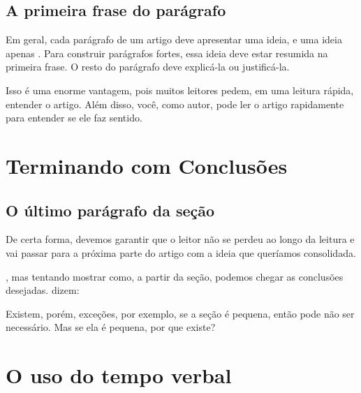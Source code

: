 \documentclass[openany]{book}
\begin{document}
\section{A primeira frase do parágrafo}

 Em geral, cada parágrafo de um artigo deve apresentar uma ideia, e uma ideia apenas . Para construir parágrafos fortes, essa ideia deve estar resumida na primeira frase. O resto do parágrafo deve explicá-la ou justificá-la.

 Isso é uma enorme vantagem, pois muitos leitores pedem, em uma leitura rápida, entender o artigo. Além disso, você, como autor, pode ler o artigo rapidamente para entender se ele faz sentido.

\chapter{Terminando com Conclusões}

\section{O último parágrafo da seção}

  De certa forma, devemos garantir que o leitor não se perdeu ao longo da leitura e vai passar para a próxima parte do artigo com a ideia que queríamos consolidada.

, mas tentando mostrar como, a partir da seção, podemos chegar as conclusões desejadas. \citet{Knuth:1997} dizem:


Existem, porém, exceções, por exemplo, se a seção é pequena, então pode não ser necessário. Mas se ela é pequena, por que existe?


\chapter{O uso do tempo verbal}
\end{document}
